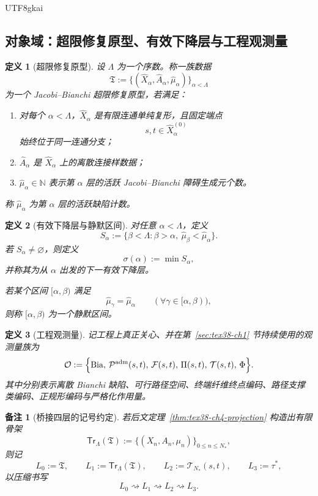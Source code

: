 \documentclass[12pt]{article}
\newtheorem{definition}{定义}[section]
\newtheorem{remark}{备注}[section]
\newcommand{\NN}{\mathbb{N}}
\newcommand{\Bia}{\operatorname{Bia}}
\begin{document}
\begin{CJK*}{UTF8}{gkai}
\subsection{对象域：超限修复原型、有效下降层与工程观测量}
\label{subsec:tex38-ch4-objects}

\begin{definition}[超限修复原型]
\label{def:tex38-ch4-transfinite-prototype}
设 $\Lambda$ 为一个序数。称一族数据
\[
  \mathfrak T
  :=
  \bigl\{
    (\widehat X_\alpha,\widehat A_\alpha,\widehat\mu_\alpha)
  \bigr\}_{\alpha<\Lambda}
\]
为一个 \emph{Jacobi--Bianchi 超限修复原型}，若满足：
\begin{enumerate}
  \item 对每个 $\alpha<\Lambda$，$\widehat X_\alpha$ 是有限连通单纯复形，且固定端点
  \[
    s,t\in \widehat X_\alpha^{(0)}
  \]
  始终位于同一连通分支；
  \item $\widehat A_\alpha$ 是 $\widehat X_\alpha$ 上的离散连接样数据；
  \item $\widehat\mu_\alpha\in\NN$ 表示第 $\alpha$ 层的活跃 Jacobi--Bianchi 障碍生成元个数。
\end{enumerate}
称 $\widehat\mu_\alpha$ 为第 $\alpha$ 层的\emph{活跃缺陷计数}。
\end{definition}

\begin{definition}[有效下降层与静默区间]
\label{def:tex38-ch4-effective-descent}
对任意 $\alpha<\Lambda$，定义
\[
  S_\alpha
  :=
  \bigl\{
    \beta<\Lambda:\beta>\alpha,\ \widehat\mu_\beta<\widehat\mu_\alpha
  \bigr\}.
\]
若 $S_\alpha\neq\varnothing$，则定义
\[
  \sigma(\alpha):=\min S_\alpha,
\]
并称其为从 $\alpha$ 出发的\emph{下一有效下降层}。

若某个区间 $[\alpha,\beta)$ 满足
\[
  \widehat\mu_\gamma=\widehat\mu_\alpha
  \qquad
  (\forall \gamma\in[\alpha,\beta)),
\]
则称 $[\alpha,\beta)$ 为一个\emph{静默区间}。
\end{definition}

\begin{definition}[工程观测量]
\label{def:tex38-ch4-observables}
记工程上真正关心、并在第~\ref{sec:tex38-ch1} 节持续使用的观测量族为
\[
  \mathcal O
  :=
  \Bigl\{
    \Bia,\,
    \mathcal P^{\mathrm{adm}}(s,t),\,
    \mathcal F(s,t),\,
    \Pi(s,t),\,
    \mathcal T(s,t),\,
    \Phi
  \Bigr\}.
\]
其中分别表示离散 Bianchi 缺陷、可行路径空间、终端纤维终点编码、路径支撑类编码、正规形编码与严格化作用量。
\end{definition}

\begin{remark}[桥接四层的记号约定]
若后文定理~\ref{thm:tex38-ch4-projection} 构造出有限骨架
\[
  \mathsf{Tr}_\Lambda(\mathfrak T)
  :=
  \bigl\{
    (X_n,A_n,\mu_n)
  \bigr\}_{0\le n\le N_\ast},
\]
则记
\[
  L_0:=\mathfrak T,
  \qquad
  L_1:=\mathsf{Tr}_\Lambda(\mathfrak T),
  \qquad
  L_2:=\mathcal T_{N_\ast}(s,t),
  \qquad
  L_3:=\tau^\ast,
\]
以压缩书写
\[
  L_0\rightsquigarrow L_1\rightsquigarrow L_2\rightsquigarrow L_3.
\]
\end{remark}


\end{CJK*}
\end{document}
